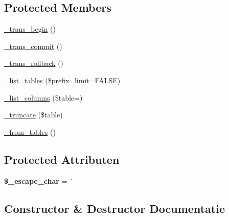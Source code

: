 \subsection*{Protected Members}
\begin{DoxyCompactItemize}
\item 
\mbox{\hyperlink{class_c_i___d_b__pdo__mysql__driver_ac81ac882c1d54347d810199a15856aac}{\+\_\+trans\+\_\+begin}} ()
\item 
\mbox{\hyperlink{class_c_i___d_b__pdo__mysql__driver_a6fe7f373e0b11cfae23a5f41c0b35dda}{\+\_\+trans\+\_\+commit}} ()
\item 
\mbox{\hyperlink{class_c_i___d_b__pdo__mysql__driver_ad49a116b0776c26b53114c9093fd102a}{\+\_\+trans\+\_\+rollback}} ()
\item 
\mbox{\hyperlink{class_c_i___d_b__pdo__mysql__driver_a435c0f3ce54fe7daa178baa8532ebd54}{\+\_\+list\+\_\+tables}} (\$prefix\+\_\+limit=F\+A\+L\+SE)
\item 
\mbox{\hyperlink{class_c_i___d_b__pdo__mysql__driver_a7ccb7f9c301fe7f0a9db701254142b63}{\+\_\+list\+\_\+columns}} (\$table=\textquotesingle{}\textquotesingle{})
\item 
\mbox{\hyperlink{class_c_i___d_b__pdo__mysql__driver_aa029600528fc1ce660a23ff4b4667f95}{\+\_\+truncate}} (\$table)
\item 
\mbox{\hyperlink{class_c_i___d_b__pdo__mysql__driver_aef43f7e3e7b71d337ff3724c5eb14f10}{\+\_\+from\+\_\+tables}} ()
\end{DoxyCompactItemize}
\subsection*{Protected Attributen}
\begin{DoxyCompactItemize}
\item 
\mbox{\label{class_c_i___d_b__pdo__mysql__driver_aaec2fb0112850159063a8e47ad3aed6e}} 
{\bfseries \$\+\_\+escape\+\_\+char} = \textquotesingle{}\`{}\textquotesingle{}
\end{DoxyCompactItemize}


\subsection{Constructor \& Destructor Documentatie}
\mbox{\label{class_c_i___d_b__pdo__mysql__driver_a9162320adff1a1a4afd7f2372f753a3e}} 

